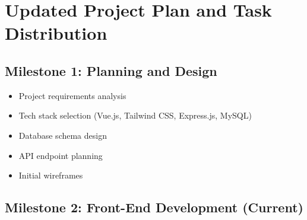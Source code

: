 \documentclass[12pt, a4paper]{article}
\newcommand{\cmark}{\textcolor{greencheck}{\ding{51}}}
\begin{document}
\section{Updated Project Plan and Task Distribution}

\subsection{Milestone 1: Planning and Design \cmark}

\begin{itemize}[nosep]
    \item[\cmark] Project requirements analysis
    \item[\cmark] Tech stack selection (Vue.js, Tailwind CSS, Express.js, MySQL)
    \item[\cmark] Database schema design
    \item[\cmark] API endpoint planning
    \item[\cmark] Initial wireframes
\end{itemize}

\subsection{Milestone 2: Front-End Development \cmark{} (Current)}
\end{document}
